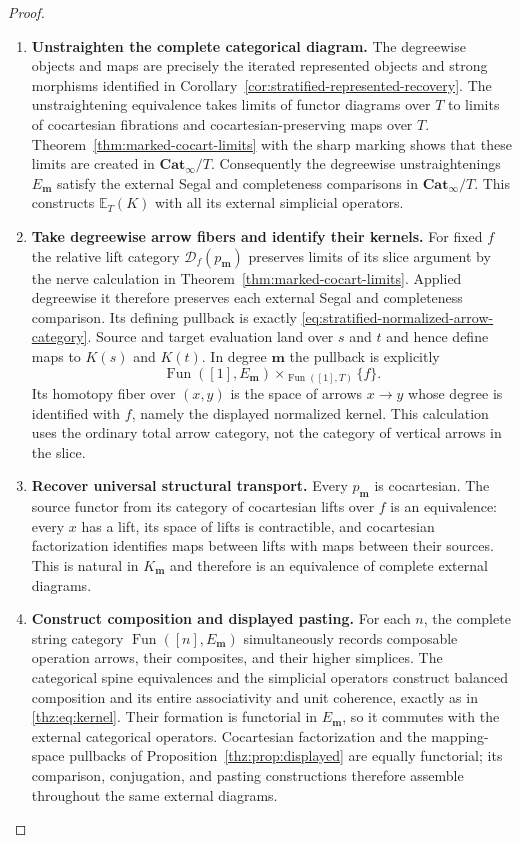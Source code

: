 \documentclass[oneside]{article}
\theoremstyle{plain}
\theoremstyle{definition}
\theoremstyle{remark}
\newcommand{\Cat}{\mathbf{Cat}_{\infty}}
\newcommand{\Fun}{\operatorname{Fun}}
\begin{document}
\begin{proof}
\leavevmode
\begin{enumerate}
\item \textbf{Unstraighten the complete categorical diagram.}
The degreewise objects and maps are precisely the iterated represented
objects and strong morphisms identified in
Corollary~\ref{cor:stratified-represented-recovery}.
The unstraightening equivalence takes limits of functor diagrams over
$T$ to limits of cocartesian fibrations and cocartesian-preserving maps
over $T$.  Theorem~\ref{thm:marked-cocart-limits} with the sharp marking
shows that these limits are created in $\Cat/T$.  Consequently the degreewise
unstraightenings $E_{\mathbf m}$ satisfy the external Segal and
completeness comparisons in $\Cat/T$.  This constructs
$\mathbb E_T(K)$ with all its external simplicial operators.
\item \textbf{Take degreewise arrow fibers and identify their kernels.}
For fixed $f$ the relative lift category
$\mathcal D_f(p_{\mathbf m})$ preserves limits of its slice
argument by the nerve calculation in
Theorem~\ref{thm:marked-cocart-limits}. Applied degreewise it
therefore preserves each external Segal and completeness comparison.
Its defining pullback is exactly
\eqref{eq:stratified-normalized-arrow-category}.  Source and target evaluation land over
$s$ and $t$ and hence define maps to $K(s)$ and $K(t)$.
In degree $\mathbf m$ the pullback is explicitly
\[
 \Fun([1],E_{\mathbf m})
 \times_{\Fun([1],T)}\{f\}.
\]
Its homotopy fiber over $(x,y)$ is the space of arrows $x\to y$
whose degree is identified with $f$, namely the displayed normalized
kernel.  This calculation uses the ordinary total arrow category,
not the category of vertical arrows in the slice.
\item \textbf{Recover universal structural transport.}
Every $p_{\mathbf m}$ is cocartesian.  The source functor from its
category of cocartesian lifts over $f$ is an equivalence: every $x$
has a lift, its space of lifts is contractible, and cocartesian
factorization identifies maps between lifts with maps between their
sources.  This is natural in $K_{\mathbf m}$ and therefore is an
equivalence of complete external diagrams.
\item \textbf{Construct composition and displayed pasting.}
For each $n$, the complete string category
$\Fun([n],E_{\mathbf m})$ simultaneously records composable operation
arrows, their composites, and their higher simplices.  The categorical
spine equivalences and the simplicial operators construct balanced
composition and its entire associativity and unit coherence, exactly
as in \eqref{thz:eq:kernel}.  Their formation is functorial in
$E_{\mathbf m}$, so it commutes with the external categorical
operators.  Cocartesian factorization and the mapping-space pullbacks
of Proposition~\ref{thz:prop:displayed} are equally functorial; its
comparison, conjugation, and pasting constructions therefore assemble
throughout the same external diagrams.\qedhere
\end{enumerate}
\end{proof}
\end{document}
